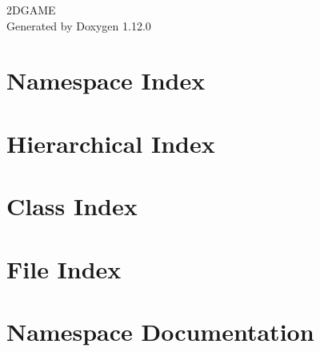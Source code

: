 \documentclass[twoside]{book}
\newcommand{\+}{\discretionary{\mbox{\scriptsize$\hookleftarrow$}}{}{}}
\newcommand{\clearemptydoublepage}{%
    \newpage{\pagestyle{empty}\cleardoublepage}%
  }
\begin{document}
  \raggedbottom
    \hypersetup{pageanchor=false,
                bookmarksnumbered=true,
                pdfencoding=unicode
               }
  \begin{titlepage}
  \vspace*{7cm}
  \begin{center}%
  {\Large 2\+DGAME}\\
  \vspace*{1cm}
  {\large Generated by Doxygen 1.12.0}\\
  \end{center}
  \end{titlepage}
  \clearemptydoublepage
  \tableofcontents
  \clearemptydoublepage
  \hypersetup{pageanchor=true}
\chapter{Namespace Index}

\chapter{Hierarchical Index}

\chapter{Class Index}

\chapter{File Index}

\chapter{Namespace Documentation}


















\end{document}
